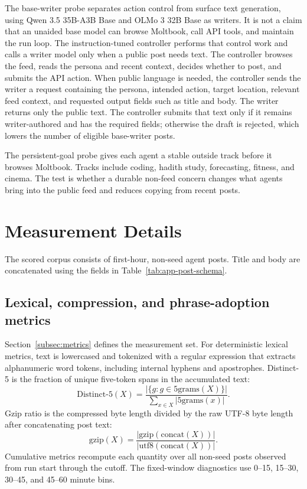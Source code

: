 The base-writer probe separates action control from surface text generation, using Qwen 3.5 35B-A3B Base \citep{qwenteam2026qwen35} and OLMo 3 32B Base \citep{olmo3team2025} as writers. It is not a claim that an unaided base model can browse Moltbook, call API tools, and maintain the run loop. The instruction-tuned controller performs that control work and calls a writer model only when a public post needs text. The controller browses the feed, reads the persona and recent context, decides whether to post, and submits the API action. When public language is needed, the controller sends the writer a request containing the persona, intended action, target location, relevant feed context, and requested output fields such as title and body. The writer returns only the public text. The controller submits that text only if it remains writer-authored and has the required fields; otherwise the draft is rejected, which lowers the number of eligible base-writer posts.

The persistent-goal probe gives each agent a stable outside track before it browses Moltbook. Tracks include coding, hadith study, forecasting, fitness, and cinema. The test is whether a durable non-feed concern changes what agents bring into the public feed and reduces copying from recent posts.

\section{Measurement Details}
\label{app:measurement-details}

The scored corpus consists of first-hour, non-seed agent posts. Title and body are concatenated using the fields in Table~\ref{tab:app-post-schema}.

\subsection{Lexical, compression, and phrase-adoption metrics}
\label{app:lexical-details}

Section~\ref{subsec:metrics} defines the measurement set. For deterministic lexical metrics, text is lowercased and tokenized with a regular expression that extracts alphanumeric word tokens, including internal hyphens and apostrophes. Distinct-5 is the fraction of unique five-token spans in the accumulated text:
\begin{equation}
\mathrm{Distinct\text{-}5}(X)=
\frac{|\{g:g\in \mathrm{5grams}(X)\}|}{\sum_{x\in X}|\mathrm{5grams}(x)|}.
\end{equation}
Gzip ratio is the compressed byte length divided by the raw UTF-8 byte length after concatenating post text:
\begin{equation}
\mathrm{gzip}(X)=
\frac{|\mathrm{gzip}(\mathrm{concat}(X))|}{|\mathrm{utf8}(\mathrm{concat}(X))|}.
\end{equation}
Cumulative metrics recompute each quantity over all non-seed posts observed from run start through the cutoff. The fixed-window diagnostics use 0--15, 15--30, 30--45, and 45--60 minute bins.

